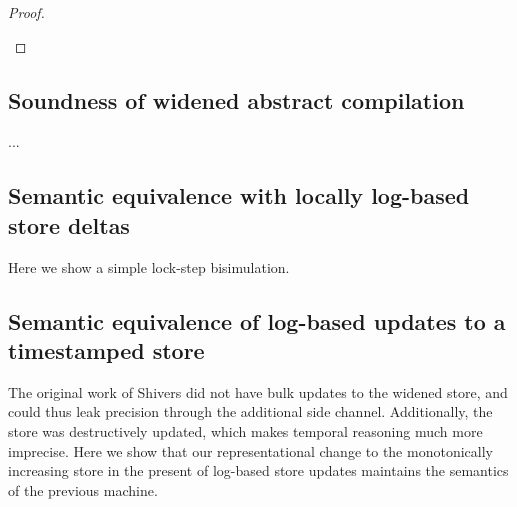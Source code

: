 \documentclass{llncs}
\begin{document}
\begin{proof}
\begin{byCases}




\end{byCases}
\end{proof}

\subsection{Soundness of widened abstract compilation}

...

\subsection{Semantic equivalence with locally log-based store deltas}

Here we show a simple lock-step bisimulation.

\subsection{Semantic equivalence of log-based updates to a timestamped store}
The original work of Shivers did not have bulk updates to the widened
store, and could thus leak precision through the additional side
channel. Additionally, the store was destructively updated, which
makes temporal reasoning much more imprecise. Here we show that our
representational change to the monotonically increasing store in the
present of log-based store updates maintains the semantics of the previous machine.
\end{document}
